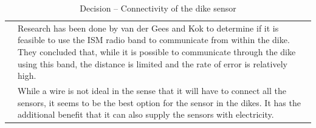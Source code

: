 \begin{table}[h!]
\begin{tabular}{L{0.2\textwidth} L{0.6\textwidth}}
                            & Research has been done by van der Gees and Kok \cite{van2009draadloos} to determine if it is feasible to use the ISM radio band to communicate from within the dike. They concluded that, while it is possible to communicate through the dike using this band, the distance is limited and the rate of error is relatively high.
                            \\
                            & While a wire is not ideal in the sense that it will have to connect all the sensors, it seems to be the best option for the sensor in the dikes. It has the additional benefit that it can also supply the sensors with electricity.
    \\ \bottomrule
\end{tabular}
\caption{Decision -- Connectivity of the dike sensor}
\label{table:linux}
\end{table}

